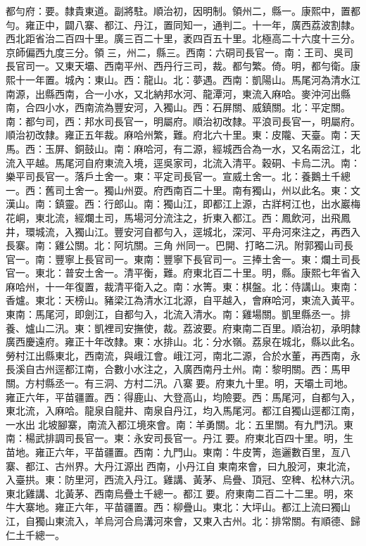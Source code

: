 \begin{pinyinscope}
都勻府：要。隸貴東道。副將駐。順治初，因明制。領州二，縣一。康熙中，置都勻。雍正中，闢八寨、都江、丹江，置同知一，通判二。十一年，廣西荔波割隸。西北距省治二百四十里。廣三百二十里，袤四百五十里。北極高二十六度十三分。京師偏西九度三分。領三，州二，縣三。西南：六硐司長官一。南：王司、吳司長官司一。又東天壩、西南平州、西丹行三司，裁。都勻繁。倚。明，都勻衛。康熙十一年置。城內：東山。西：龍山。北：夢遇。西南：凱陽山。馬尾河為清水江南源，出縣西南，合一小水，又北納邦水河、龍潭河，東流入麻哈。麥沖河出縣南，合四小水，西南流為豐安河，入獨山。西：石屏關、威鎮關。北：平定關。南：都勻司，西：邦水司長官一，明屬府。順治初改隸。平浪司長官一，明屬府。順治初改隸。雍正五年裁。麻哈州繁，難。府北六十里。東：皮隴、天臺。南：天馬。西：玉屏、銅鼓山。南：麻哈河，有二源，經城西合為一水，又名兩岔江，北流入平越。馬尾河自府東流入境，逕吳家司，北流入清平。穀硐、卡烏二汛。南：樂平司長官一。落戶土舍一。東：平定司長官一。宣威土舍一。北：養鵝土千總一。西：舊司土舍一。獨山州耍。府西南百二十里。南有獨山，州以此名。東：文漢山。南：鎮靈。西：行郎山。南：獨山江，即都江上源，古牂柯江也，出水巖梅花峒，東北流，經爛土司，馬場河分流注之，折東入都江。西：鳳飲河，出飛鳳井，環城流，入獨山江。豐安河自都勻入，逕城北，深河、平舟河來注之，再西入長寨。南：雞公關。北：阿坑關。三角州同一。巴開、打略二汛。附郭獨山司長官一。南：豐寧上長官司一。東南：豐寧下長官司一。三捧土舍一。東：爛土司長官一。東北：普安土舍一。清平衡，難。府東北百二十里。明，縣。康熙七年省入麻哈州，十一年復置，裁清平衛入之。南：水箐。東：棋盤。北：侍講山。東南：香爐。東北：天榜山。豬梁江為清水江北源，自平越入，會麻哈河，東流入黃平。東南：馬尾河，即劍江，自都勻入，北流入清水。南：雞場關。凱里縣丞一。排養、爐山二汛。東：凱裡司安撫使，裁。荔波要。府東南二百里。順治初，承明隸廣西慶遠府。雍正十年改隸。東：水排山。北：分水嶺。荔泉在城北，縣以此名。勞村江出縣東北，西南流，與峨江會。峨江河，南北二源，合於水董，再西南，永長溪自古州逕都江南，合數小水注之，入廣西南丹土州。南：黎明關。西：馬甲關。方村縣丞一。有三洞、方村二汛。八寨要。府東九十里。明，天壩土司地。雍正六年，平苗疆置。西：得鹿山、大登高山，均險要。西：馬尾河，自都勻入，東北流，入麻哈。龍泉自龍井、南泉自丹江，均入馬尾河。都江自獨山逕都江南，一水出北坡腳寨，南流入都江境來會。南：羊勇關。北：五里關。有九門汛。東南：楊武排調司長官一。東：永安司長官一。丹江要。府東北百四十里。明，生苗地。雍正六年，平苗疆置。西南：九門山。東南：牛皮箐，迤邐數百里，亙八寨、都江、古州界。大丹江源出西南，小丹江自東南來會，曰九股河，東北流，入臺拱。東：防里河，西流入丹江。雞講、黃茅、烏疊、頂冠、空稗、松林六汛。東北雞講、北黃茅、西南烏疊土千總一。都江要。府東南二百二十二里。明，來牛大寨地。雍正六年，平苗疆置。西：柳疊山。東北：大坪山。都江上流曰獨山江，自獨山東流入，羊烏河合烏溝河來會，又東入古州。北：排常關。有順德、歸仁土千總一。


\end{pinyinscope}
